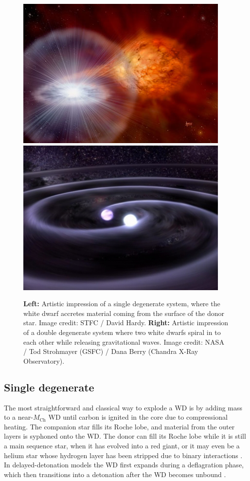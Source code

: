 \documentclass[a4paper,oneside,12pt, class=Latex/Classes/PhDthesisPSnPDF, crop=false]{standalone}
\begin{document}
\begin{figure}
    \centering
    \includegraphics[height=0.229\textheight]{../Images/chapter_1/single_deg.jpeg}
    \includegraphics[height=0.229\textheight]{../Images/chapter_1/double_deg.jpeg}
    \caption[Artistic impressions of single and double degenerate systems.]{\textbf{Left:} Artistic impression of a single degenerate system, where the white dwarf accretes material coming from the surface of the donor star. Image credit: STFC / David Hardy. \textbf{Right:} Artistic impression of a double degenerate system where two white dwarfs spiral in to each other while releasing gravitational waves. Image credit: NASA / Tod Strohmayer (GSFC) / Dana Berry (Chandra X-Ray Observatory).}
    \label{single_double_deg_mods}
\end{figure}


\subsection{Single degenerate}
The most straightforward and classical way to explode a WD is by adding mass to a near-$M_\text{Ch}$ WD until carbon is ignited in the core due to compressional heating. The companion star fills its Roche lobe, and material from the outer layers is syphoned onto the WD. The donor can fill its Roche lobe while it is still a main sequence star, when it has evolved into a red giant, or it may even be a helium star whose hydrogen layer has been stripped due to binary interactions \citep{Whelan_classical_Ia_mod, Nomoto_single_degenerate}. In delayed-detonation models the WD first expands during a deflagration phase, which then transitions into a detonation after the WD becomes unbound \citep{Kholov_Del_det, Mazzali_common_mechanism}.
\end{document}
